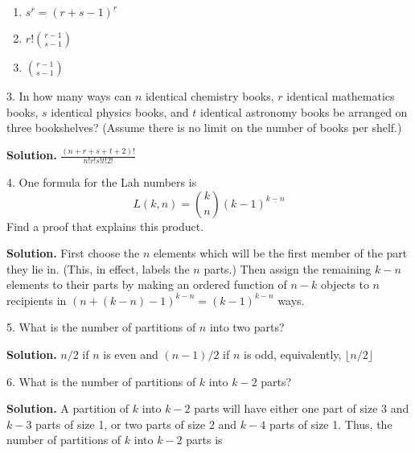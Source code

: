\documentclass[10pt,]{book}
\theoremstyle{plain}
\theoremstyle{definition}
\theoremstyle{definition}
\numberwithin{equation}{chapter}
\begin{document}
\begin{exerciselist}
\begin{enumerate}[label=(\alph*)]
\item\hypertarget{li-67}{}\(s^{\overline{r}}=(r+s-1)^{\underline{r}}\)%
\item\hypertarget{li-68}{}\(r!\binom{r-1}{s-1}\)%
\item\hypertarget{li-69}{}\(\binom{r-1}{s-1}\)%
\end{enumerate}
%
\item[3.]\hypertarget{exercise-25}{}In how many ways can \(n\) identical chemistry books, \(r\) identical mathematics books, \(s\) identical physics books, and \(t\) identical astronomy books be arranged on three bookshelves?  (Assume there is no limit on the number of books per shelf.)%
\par\smallskip
\par\smallskip
\noindent\textbf{Solution.}\hypertarget{solution-271}{}\quad
\(\frac{(n+r+s+t+2)!}{n!r!s!t!2!}\)%
\item[4.]\hypertarget{exercise-26}{}One formula for the Lah numbers is%
\begin{equation*}
L(k,n) = \binom{k}{n}(k-1)^{\underline{k-n}}
\end{equation*}
Find a proof that explains this product.%
\par\smallskip
\par\smallskip
\noindent\textbf{Solution.}\hypertarget{solution-272}{}\quad
First choose the \(n\) elements which will be the first member of the part they lie in. (This, in effect, labels the \(n\) parts.) Then assign the remaining \(k-n\) elements to their parts by making an ordered function of \(n-k\) objects to \(n\) recipients in \((n + (k-n) - 1)^{{k-n}} = (k-1)^{{k-n}}\) ways.%
\item[5.]\hypertarget{exercise-27}{}What is the number of partitions of \(n\) into two parts?%
\par\smallskip
\par\smallskip
\noindent\textbf{Solution.}\hypertarget{solution-273}{}\quad
\(n/2\) if \(n\) is even and \((n-1)/2\) if \(n\) is odd, equivalently, \(\lfloor n/2\rfloor\)%
\item[6.]\hypertarget{partitions-k-2-parts}{}What is the number of partitions of \(k\) into \(k - 2\) parts?%
\par\smallskip
\par\smallskip
\noindent\textbf{Solution.}\hypertarget{solution-274}{}\quad
A partition of \(k\) into \(k-2\) parts will have either one part of size 3 and \(k-3\) parts of size 1, or two parts of size 2 and \(k-4\) parts of size 1. Thus, the number of partitions of \(k\) into \(k-2\) parts is%

\end{exerciselist}
\end{document}
